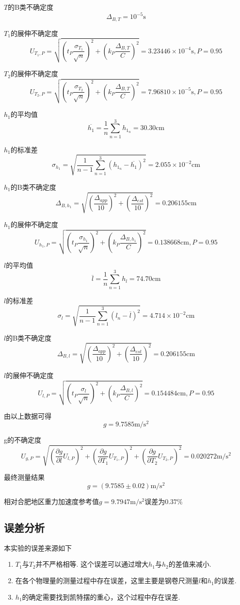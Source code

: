 \documentclass[UTF8]{ctexart}
\begin{document}
$T$的B类不确定度
\[\Delta_{B,T}=10^{-5}\mathrm{s}\]

$T_1$的展伸不确定度
\[U_{T_1, P}=\sqrt{\left(t_P\frac{\sigma_{T_1}}{\sqrt{n}}\right)^2+\left(k_P\frac{\Delta_{B,T}}{C}\right)^2}=3.23446\times 10^{-4}\mathrm{s}, P=0.95\]

$T_2$的展伸不确定度
\[U_{T_2, P}=\sqrt{\left(t_P\frac{\sigma_{T_2}}{\sqrt{n}}\right)^2+\left(k_P\frac{\Delta_{B,T}}{C}\right)^2}=7.96810\times 10^{-5}\mathrm{s}, P=0.95\]

$h_1$的平均值
\[\overline{h_1} = \frac{1}{n}\sum_{n=1}^{3} h_{1_n} = 30.30\mathrm{cm}\]

$h_1$的标准差
\[\sigma_{h_1} = \sqrt{\frac{1}{n-1}\sum_{n=1}^{3}\left(h_{1_n}-\overline{h_1}\right)^2} = 2.055\times 10^{-2}\mathrm{cm}\]

$h_1$的B类不确定度
\[\Delta_{B,h_1} = \sqrt{\left(\frac{\Delta_{app}}{10}\right)^2 + \left(\frac{\Delta_{est}}{10}\right)^2}=0.206155\mathrm{cm}\]

$h_1$的展伸不确定度
\[U_{h_1, P}=\sqrt{\left(t_P\frac{\sigma_{h_1}}{\sqrt{n}}\right)^2+\left(k_P\frac{\Delta_{B,h_1}}{C}\right)^2}=0.138668\mathrm{cm}, P=0.95\]

$l$的平均值
\[\overline{l} = \frac{1}{n}\sum_{n=1}^{3} h_{l} = 74.70\mathrm{cm}\]

$l$的标准差
\[\sigma_{l} = \sqrt{\frac{1}{n-1}\sum_{n=1}^{3}\left(l_n-\overline{l}\right)^2} = 4.714\times 10^{-2}\mathrm{cm}\]

$l$的B类不确定度
\[\Delta_{B,l} = \sqrt{\left(\frac{\Delta_{app}}{10}\right)^2 + \left(\frac{\Delta_{est}}{10}\right)^2}=0.206155\mathrm{cm}\]

$l$的展伸不确定度
\[U_{l, P}=\sqrt{\left(t_P\frac{\sigma_{l}}{\sqrt{n}}\right)^2+\left(k_P\frac{\Delta_{B,l}}{C}\right)^2}=0.154484\mathrm{cm}, P=0.95\]

由以上数据可得
\[g = 9.7585\mathrm{m/s^2}\]

g的不确定度
\[U_{g,P}=\sqrt{\left(\frac{\partial g}{\partial l}U_{l,P}\right)^2+\left(\frac{\partial g}{\partial T_1}U_{T_1,P}\right)^2+\left(\frac{\partial g}{\partial T_2}U_{T_2,P}\right)^2}=0.020272\mathrm{m/s^2}\]

最终测量结果
\[g=\left(9.7585 \pm 0.02\right)\mathrm{m/s^2}\]

相对合肥地区重力加速度参考值$g=9.7947\mathrm{m/s^2}$误差为$0.37\%$

\subsection{误差分析}
本实验的误差来源如下
\begin{enumerate}
  \item $T_1$与$T_2$并不严格相等. 这个误差可以通过增大$h_1$与$h_2$的差值来减小.
  \item 在各个物理量的测量过程中存在误差，这里主要是钢卷尺测量$l$和$h_1$的误差.
  \item $h_1$的确定需要找到凯特摆的重心，这个过程中存在误差.
\end{enumerate}
\end{document}
